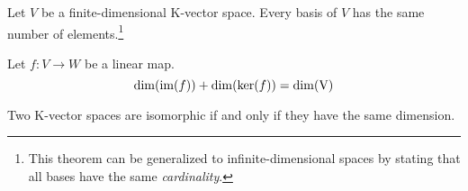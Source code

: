         \begin{property}
		Let $V$ be a finite-dimensional K-vector space. Every basis of $V$ has the same number of elements.\footnote{This theorem can be generalized to infinite-dimensional spaces by stating that all bases have the same \textit{cardinality}.}
	\end{property}

        \begin{theorem}
		Let $f: V \rightarrow W$ be a linear map.
	        \begin{equation}
	                \label{linalgebra:dimension_theorem}
	                \dim(\text{\upshape im}(f)) + \dim(\text{\upshape ker}(f)) = \dim(\text{\upshape V})
	        \end{equation}
        \end{theorem}

        \begin{theorem}\label{linalgebra:isomorphic_dimension}
		Two K-vector spaces are isomorphic if and only if they have the same dimension.
	\end{theorem}
